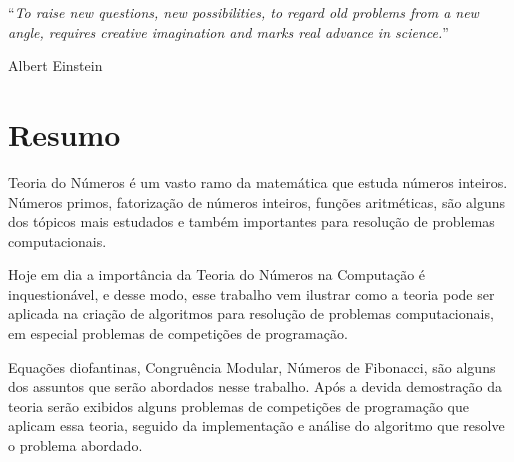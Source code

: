 \documentclass[
11pt, %
brazilian, %
singlespacing, %
]{MastersDoctoralThesis} %
\begin{document}


\vspace*{0.2\textheight}

\noindent\enquote{\itshape To raise new questions, new possibilities, to regard old problems from a new angle, requires creative imagination and marks real advance in science.}\bigbreak

\hfill Albert Einstein
\newpage

\chapter*{Resumo}
\thispagestyle{empty}

Teoria do Números é um vasto ramo da matemática que estuda números inteiros. Números primos, fatorização de números inteiros, funções aritméticas, são alguns dos tópicos mais estudados e também importantes para resolução de problemas computacionais.

Hoje em dia a importância da Teoria do Números na Computação é inquestionável, e desse modo, esse trabalho vem ilustrar como a teoria pode ser aplicada na criação de algoritmos para resolução de problemas computacionais, em especial problemas de competições de programação.

Equações diofantinas, Congruência Modular, Números de Fibonacci, são alguns dos assuntos que serão abordados nesse trabalho. Após a devida demostração da teoria serão exibidos alguns problemas de competições de programação que aplicam essa teoria, seguido da implementação e análise do algoritmo que resolve o problema abordado.

\clearpage

\end{document}
